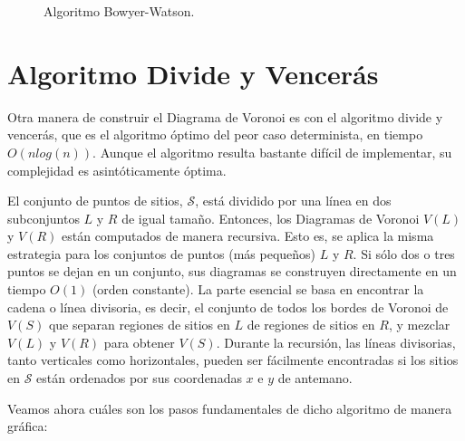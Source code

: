 \begin{figure}[H]
{    }
    \caption{Algoritmo Bowyer-Watson.} \label{fig:incre}
\end{figure}

\section{Algoritmo Divide y Vencerás}

Otra manera de construir el Diagrama de Voronoi es con el algoritmo divide y vencerás, que es el algoritmo óptimo del peor caso determinista, en tiempo $O(nlog(n))$. Aunque el algoritmo resulta bastante difícil de implementar, su complejidad es asintóticamente óptima.
\vspace{0.3cm}

El conjunto de puntos de sitios, $\mathcal{S}$, está dividido por una línea en dos subconjuntos $L$ y $R$ de igual tamaño. Entonces, los Diagramas de Voronoi $V(L)$ y $V(R)$ están computados de manera recursiva. Esto es, se aplica la misma estrategia para los conjuntos de puntos (más pequeños) $L$ y $R$. Si sólo dos o tres puntos se dejan en un conjunto, sus diagramas se construyen directamente en un tiempo $O(1)$ (orden constante).
La parte esencial se basa en encontrar la cadena o línea divisoria, es decir, el conjunto de todos los bordes de Voronoi de $V(S)$ que separan regiones de sitios en $L$ de regiones de sitios en $R$, y mezclar $V(L)$ y $V(R)$ para obtener $V(S)$. Durante la recursión, las líneas divisorias, tanto verticales como horizontales, pueden ser fácilmente encontradas si los sitios en $\mathcal{S}$ están ordenados por sus coordenadas $x$ e $y$ de antemano.

Veamos ahora cuáles son los pasos fundamentales de dicho algoritmo de manera gráfica:


